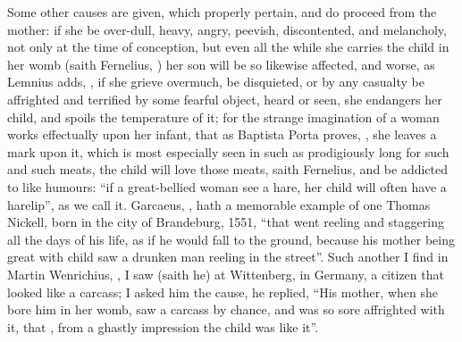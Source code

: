 Some other causes are given, which properly pertain, and do proceed from the
mother: if she be over-dull, heavy, angry, peevish, discontented, and
melancholy, not only at the time of conception, but even all the while she
carries the child in her womb (saith Fernelius, ) her son will be so likewise affected, and worse, as
Lemnius adds, , if she
grieve overmuch, be disquieted, or by any casualty be affrighted and terrified
by some fearful object, heard or seen, she endangers her child, and spoils the
temperature of it; for the strange imagination of a woman works effectually
upon her infant, that as Baptista Porta proves, , she leaves a mark upon it, which is most especially
seen in such as prodigiously long for such and such meats, the child will love
those meats, saith Fernelius, and be addicted to like humours:
\enquote{if a great-bellied woman see a hare, her child will often
have a harelip}, as we call it. Garcaeus, , hath a memorable example of one Thomas Nickell, born in
the city of Brandeburg, 1551, \enquote{that went reeling and
staggering all the days of his life, as if he would fall to the ground, because
his mother being great with child saw a drunken man reeling in the street}.
Such another I find in Martin Wenrichius, , I saw (saith he) at Wittenberg, in Germany, a citizen that
looked like a carcass; I asked him the cause, he replied,
\enquote{His mother, when she bore him in her womb, saw a carcass
by chance, and was so sore affrighted with it, that , from a ghastly impression the child was like it}.

